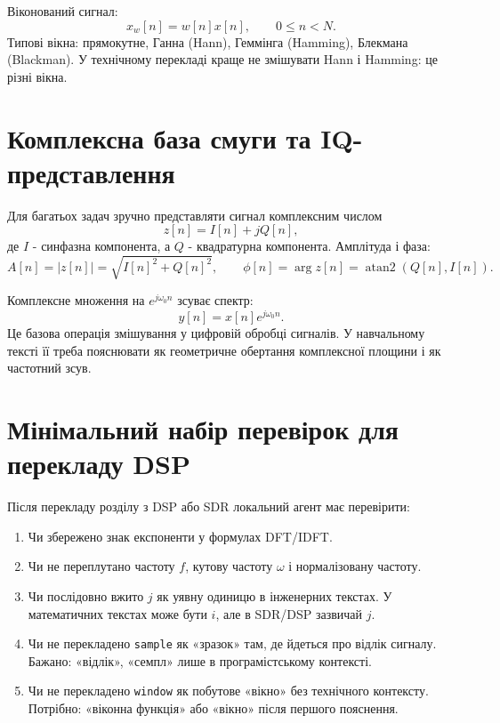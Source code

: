 Віконований сигнал:
\begin{equation}
    x_w[n] = w[n]x[n], \qquad 0\leq n<N.
\end{equation}
Типові вікна: прямокутне, Ганна (Hann), Геммінга (Hamming), Блекмана (Blackman). У технічному перекладі краще не змішувати Hann і Hamming: це різні вікна.

\section{Комплексна база смуги та IQ-представлення}

Для багатьох задач зручно представляти сигнал комплексним числом
\begin{equation}
    z[n] = I[n] + jQ[n],
\end{equation}
де $I$ - синфазна компонента, а $Q$ - квадратурна компонента. Амплітуда і фаза:
\begin{equation}
    A[n] = |z[n]| = \sqrt{I[n]^2+Q[n]^2},
    \qquad
    \phi[n] = \arg z[n] = \operatorname{atan2}(Q[n],I[n]).
\end{equation}

Комплексне множення на $e^{j\omega_0 n}$ зсуває спектр:
\begin{equation}
    y[n] = x[n]e^{j\omega_0 n}.
\end{equation}
Це базова операція змішування у цифровій обробці сигналів. У навчальному тексті її треба пояснювати як геометричне обертання комплексної площини і як частотний зсув.

\section{Мінімальний набір перевірок для перекладу DSP}

Після перекладу розділу з DSP або SDR локальний агент має перевірити:

\begin{enumerate}[label=\arabic*.]
  \item Чи збережено знак експоненти у формулах DFT/IDFT.
  \item Чи не переплутано частоту $f$, кутову частоту $\omega$ і нормалізовану частоту.
  \item Чи послідовно вжито $j$ як уявну одиницю в інженерних текстах. У математичних текстах може бути $i$, але в SDR/DSP зазвичай $j$.
  \item Чи не перекладено \texttt{sample} як «зразок» там, де йдеться про відлік сигналу. Бажано: «відлік», «семпл» лише в програмістському контексті.
  \item Чи не перекладено \texttt{window} як побутове «вікно» без технічного контексту. Потрібно: «віконна функція» або «вікно» після першого пояснення.
\end{enumerate}

